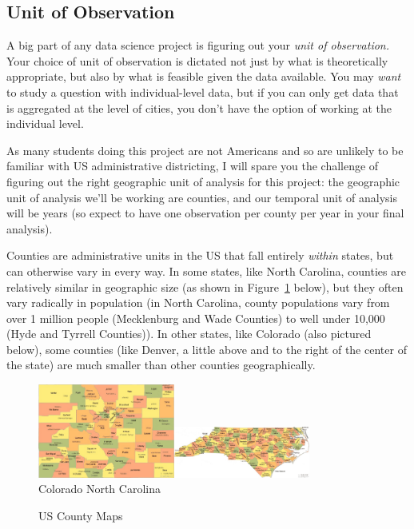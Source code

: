 \documentclass[12pt]{article}
\begin{document}
\subsection*{Unit of Observation}

A big part of any data science project is figuring out your \emph{unit of observation.} Your choice of unit of observation is dictated not just by what is theoretically appropriate, but also by what is feasible given the data available. You may \emph{want} to study a question with individual-level data, but if you can only get data that is aggregated at the level of cities, you don't have the option of working at the individual level.

As many students doing this project are not Americans and so are unlikely to be familiar with US administrative districting, I will spare you the challenge of figuring out the right geographic unit of analysis for this project: the geographic unit of analysis we'll be working are counties, and our temporal unit of analysis will be years (so expect to have one observation per county per year in your final analysis).

Counties are administrative units in the US that fall entirely \emph{within} states, but can otherwise vary in every way. In some states, like North Carolina, counties are relatively similar in geographic size (as shown in Figure~\ref{counties} below), but they often vary radically in population (in North Carolina, county populations vary from over 1 million people (Mecklenburg and Wade Counties) to well under 10,000 (Hyde and Tyrrell Counties)). In other states, like Colorado (also pictured below), some counties (like Denver, a little above and to the right of the center of the state) are much smaller than other counties geographically.

\begin{figure}[h!]
  \centering
  \caption{US County Maps}\label{counties}
  \includegraphics[width=0.4\textwidth]{images/CO_counties.jpg}\includegraphics[width=0.4\textwidth]{images/NC_counties.jpg}\\
  \scriptsize{Colorado \hspace*{5cm} North Carolina}
\end{figure}
\end{document}
